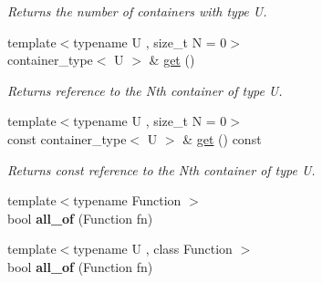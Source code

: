 \begin{DoxyCompactItemize}
\begin{DoxyCompactList}\small\item\em Returns the number of containers with type U. \end{DoxyCompactList}\item 
\hypertarget{classheterogeneous_1_1vector_3_01_t_00_01_types_8_8_8_4_a620c9d432b3540832297acb12205f072}{}{\footnotesize template$<$typename U , size\+\_\+t N = 0$>$ }\\container\+\_\+type$<$ U $>$ \& \hyperlink{classheterogeneous_1_1vector_3_01_t_00_01_types_8_8_8_4_a620c9d432b3540832297acb12205f072}{get} ()\label{classheterogeneous_1_1vector_3_01_t_00_01_types_8_8_8_4_a620c9d432b3540832297acb12205f072}

\begin{DoxyCompactList}\small\item\em Returns reference to the Nth container of type U. \end{DoxyCompactList}\item 
\hypertarget{classheterogeneous_1_1vector_3_01_t_00_01_types_8_8_8_4_a18e008fff85d5356bcf91d1811aaf853}{}{\footnotesize template$<$typename U , size\+\_\+t N = 0$>$ }\\const container\+\_\+type$<$ U $>$ \& \hyperlink{classheterogeneous_1_1vector_3_01_t_00_01_types_8_8_8_4_a18e008fff85d5356bcf91d1811aaf853}{get} () const \label{classheterogeneous_1_1vector_3_01_t_00_01_types_8_8_8_4_a18e008fff85d5356bcf91d1811aaf853}

\begin{DoxyCompactList}\small\item\em Returns const reference to the Nth container of type U. \end{DoxyCompactList}\item 
\hypertarget{classheterogeneous_1_1vector_3_01_t_00_01_types_8_8_8_4_ad623de1c99aa010aecade5cedb242024}{}{\footnotesize template$<$typename Function $>$ }\\bool {\bfseries all\+\_\+of} (Function fn)\label{classheterogeneous_1_1vector_3_01_t_00_01_types_8_8_8_4_ad623de1c99aa010aecade5cedb242024}

\item 
\hypertarget{classheterogeneous_1_1vector_3_01_t_00_01_types_8_8_8_4_aa646ef553ea0280f8392b7f4c5a0a0df}{}{\footnotesize template$<$typename U , class Function $>$ }\\bool {\bfseries all\+\_\+of} (Function fn)\label{classheterogeneous_1_1vector_3_01_t_00_01_types_8_8_8_4_aa646ef553ea0280f8392b7f4c5a0a0df}


\end{DoxyCompactItemize}
